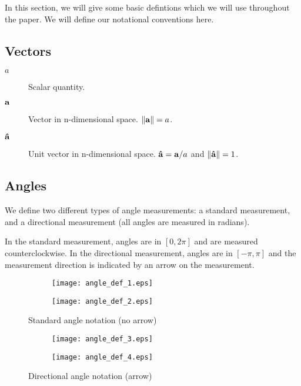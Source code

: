 In this section, we will give some basic defintions which we will use throughout the paper. We will define our notational conventions here.

\subsection{Vectors}

\begin{description}
  \item[$a$] Scalar quantity.
  \item[$\mathbf{a}$] Vector in n-dimensional space. $\norm{\bvec{a}} = a$.
  \item[$\mathbf{\hat{a}}$] Unit vector in n-dimensional space. $\mathbf{\hat{a}} = \mathbf{a}/a$ and $\norm{\bhat{a}} = 1$.
\end{description}

\subsection{Angles}

We define two different types of angle measurements: a standard measurement, and a directional measurement (all angles are measured in radians).

In the standard measurement, angles are in $[0, 2\pi]$ and are measured counterclockwise. In the directional measurement, angles are in $[-\pi, \pi]$ and the measurement direction is indicated by an arrow on the measurement.

\begin{figure}[H]
  \centering
  \begin{subfigure}[b]{0.4\textwidth}
    \texttt{[image: angle\_def\_1.eps]}
    \caption{}
    \label{fig:angle-def-1}
  \end{subfigure}
  \qquad \qquad
  \begin{subfigure}[b]{0.4\textwidth}
    \texttt{[image: angle\_def\_2.eps]}
    \caption{}
    \label{fig:angle-def-2}
  \end{subfigure}
  \caption{Standard angle notation (no arrow)}
\end{figure}

\begin{figure}[H]
  \begin{subfigure}[b]{0.4\textwidth}
    \texttt{[image: angle\_def\_3.eps]}
    \caption{}
    \label{fig:angle-def-3}
  \end{subfigure}
  \qquad \qquad
  \begin{subfigure}[b]{0.4\textwidth}
    \texttt{[image: angle\_def\_4.eps]}
    \caption{}
    \label{fig:angle-def-4}
  \end{subfigure}
  \caption{Directional angle notation (arrow)}
\end{figure}
